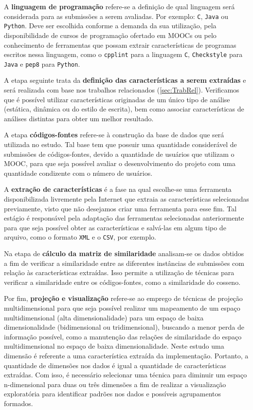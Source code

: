 	 	A \textbf{linguagem de programação} refere-se a definição de qual linguagem será
	 	considerada para as submissões a serem avaliadas. Por exemplo: \texttt{C}, \texttt{Java}
	 	ou \texttt{Python}. Deve ser escolhida conforme a demanda da sua utilização, pela
	 	disponibilidade de cursos de programação ofertado em \acs{MOOC}s ou pelo conhecimento
	 	de ferramentas que possam extrair características de programas escritos nessa linguagem, como o
	 	\texttt{cpplint} para a linguagem \texttt{C}, \texttt{Checkstyle} para
	 	\texttt{Java} e \texttt{pep8} para \texttt{Python}.
	 	
	 	A etapa seguinte trata da \textbf{definição das características a serem extraídas} e será
	 	realizada com base nos trabalhos relacionados (\cref{sec:TrabRel}). Verificamos
	 	que é possível utilizar características originadas de um único tipo de análise
	 	(estática, dinâmica ou do estilo de escrita), bem como associar características
	 	de análises distintas para obter um melhor resultado.
	 	
	 	A etapa \textbf{códigos-fontes} refere-se à construção da base de dados que será
	 	utilizada no estudo. Tal base tem que possuir uma quantidade considerável de
	 	submissões de códigos-fontes, devido a quantidade de usuários que utilizam o \acs{MOOC},
	 	para que seja possível avaliar o desenvolvimento do projeto com uma quantidade
	 	condizente com o número de usuários.
	 	
	 	A \textbf{extração de características} é a fase na qual escolhe-se uma ferramenta
	 	disponibilizada livremente pela Internet que extraia as características selecionadas
	 	previamente, visto que não desejamos criar uma ferramenta para esse fim. Tal estágio
	 	é responsável pela adaptação das ferramentas selecionadas anteriormente para que seja
	 	possível obter as características e salvá-las em algum tipo de arquivo, como o
	 	formato \texttt{XML} e o \texttt{CSV}, por exemplo.
	 	
	 	Na etapa de \textbf{cálculo da matriz de similaridade} analisam-se os dados obtidos a
	 	fim de verificar a similaridade entre as diferentes instâncias de submissões com relação
	 	às características extraídas. Isso permite a utilização de técnicas para verificar a similaridade
	 	entre os códigos-fontes, como a similaridade do cosseno.
	 	
	 	Por fim, \textbf{projeção e visualização} refere-se ao emprego de técnicas de
	 	projeção multidimensional para que seja possível realizar um mapeamento de um
	 	espaço multidimensional (alta dimensionalidade) para um espaço de baixa
	 	dimensionalidade (bidimensional ou tridimensional), buscando a menor perda de
	 	informação possível, como a manutenção das relações de similaridade do espaço
	 	multidimensional no espaço de baixa dimensionalidade. Neste estudo uma dimensão
	 	é referente a uma característica extraída da implementação. Portanto, a quantidade
	 	de dimensões nos dados é igual a quantidade de características extraídas. Com isso,
	 	é necessário selecionar uma técnica para diminuir um espaço n-dimensional para
	 	duas ou três dimensões a fim de realizar a visualização exploratória para
	 	identificar padrões nos dados e possíveis agrupamentos formados.
	 	
